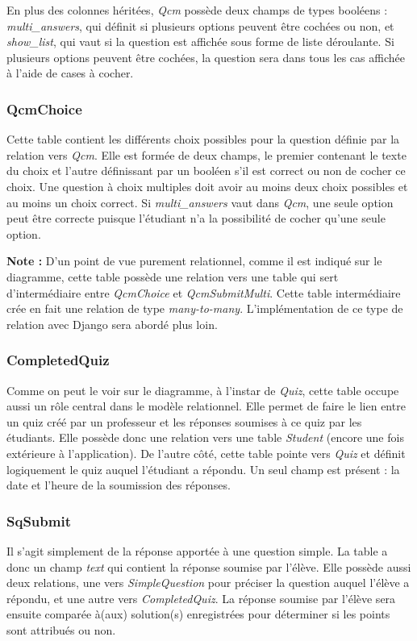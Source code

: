 \documentclass[letterpaper,10pt,french]{sphinxmanual}
\begin{document}
En plus des colonnes héritées, \emph{Qcm} possède deux champs de types booléens : \emph{multi\_answers}, qui définit si plusieurs options peuvent être cochées ou non, et \emph{show\_list}, qui vaut  si la question est affichée sous forme de liste déroulante. Si plusieurs options peuvent être cochées, la question sera dans tous les cas affichée à l'aide de cases à cocher.


\subsubsection{QcmChoice}
\label{database:qcmchoice}
Cette table contient les différents choix possibles pour la question définie par la relation vers \emph{Qcm}. Elle est formée de deux champs, le premier contenant le texte du choix et l'autre définissant par un booléen s'il est correct ou non de cocher ce choix. Une question à choix multiples doit avoir au moins deux choix possibles et au moins un choix correct. Si \emph{multi\_answers} vaut  dans \emph{Qcm}, une seule option peut être correcte puisque l'étudiant n'a la possibilité de cocher qu'une seule option.

\textbf{Note :} D'un point de vue purement relationnel, comme il est indiqué sur le diagramme, cette table possède une relation vers une table qui sert d'intermédiaire entre \emph{QcmChoice} et \emph{QcmSubmitMulti}. Cette table intermédiaire crée en fait une relation de type \emph{many-to-many}. L'implémentation de ce type de relation avec Django sera abordé plus loin.


\subsubsection{CompletedQuiz}
\label{database:completedquiz}
Comme on peut le voir sur le diagramme, à l'instar de \emph{Quiz}, cette table occupe aussi un rôle central dans le modèle relationnel. Elle permet de faire le lien entre un quiz créé par un professeur et les réponses soumises à ce quiz par les étudiants. Elle possède donc une relation vers une table \emph{Student} (encore une fois extérieure à l'application). De l'autre côté, cette table pointe vers \emph{Quiz} et définit logiquement le quiz auquel l'étudiant a répondu. Un seul champ est présent : la date et l'heure de la soumission des réponses.


\subsubsection{SqSubmit}
\label{database:sqsubmit}
Il s'agit simplement de la réponse apportée à une question simple. La table a donc un champ \emph{text} qui contient la réponse soumise par l'élève. Elle possède aussi deux relations, une vers \emph{SimpleQuestion} pour préciser la question auquel l'élève a répondu, et une autre vers \emph{CompletedQuiz}. La réponse soumise par l'élève sera ensuite comparée à(aux) solution(s) enregistrées pour déterminer si les points sont attribués ou non.
\end{document}
